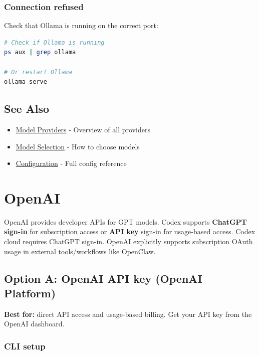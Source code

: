 \subsubsection{Connection refused}


Check that Ollama is running on the correct port:

\begin{lstlisting}[language=bash]
# Check if Ollama is running
ps aux | grep ollama

# Or restart Ollama
ollama serve
\end{lstlisting}


\subsection{See Also}


\begin{itemize}
  \item \href{/concepts/model-providers}{Model Providers} - Overview of all providers
  \item \href{/concepts/models}{Model Selection} - How to choose models
  \item \href{/gateway/configuration}{Configuration} - Full config reference
\end{itemize}



\clearpage

\section{OpenAI}


OpenAI provides developer APIs for GPT models. Codex supports \textbf{ChatGPT sign-in} for subscription
access or \textbf{API key} sign-in for usage-based access. Codex cloud requires ChatGPT sign-in.
OpenAI explicitly supports subscription OAuth usage in external tools/workflows like OpenClaw.

\subsection{Option A: OpenAI API key (OpenAI Platform)}


\textbf{Best for:} direct API access and usage-based billing.
Get your API key from the OpenAI dashboard.

\subsubsection{CLI setup}


